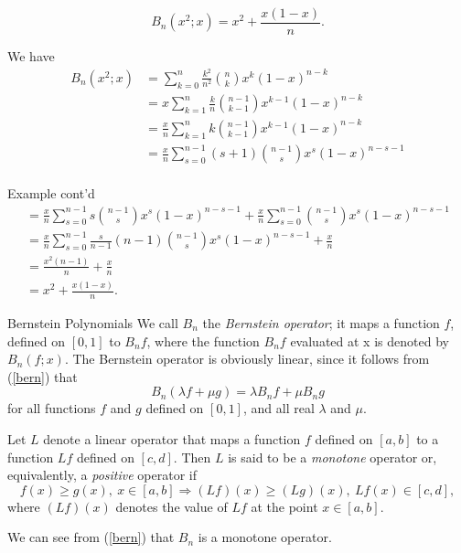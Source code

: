 \documentclass{beamer}
\begin{document}
\begin{frame}
    \begin{example}
   \begin{equation}
       \label{bernx2}
       B_n(x^2;x) = x^2 + \frac{x(1-x)}{n}.
   \end{equation}
   
       We have
       \begin{align*}
           B_n(x^2;x)
           &=\sum_{k=0}^n\frac{k^2}{n^2}\binom{n}{k}x^k(1-x)^{n-k}\\
           &=x\sum_{k=1}^n\frac{k}{n}\binom{n-1}{k-1}x^{k-1}(1-x)^{n-k}\\
           &=\frac{x}{n}\sum_{k=1}^nk\binom{n-1}{k-1}x^{k-1}(1-x)^{n-k}\\
           &=\frac{x}{n}\sum_{s=0}^{n-1}(s+1)\binom{n-1}{s}x^s(1-x)^{n-s-1}\\
       \end{align*}
\end{example}
\end{frame}
\begin{frame}{Example cont'd}
    \begin{align*}
         =\frac{x}{n}\sum_{s=0}^{n-1}s\binom{n-1}{s}x^s(1-x)^{n-s-1}+\frac{x}{n}\sum_{s=0}^{n-1}\binom{n-1}{s}x^s(1-x)^{n-s-1}\\
           =\frac{x}{n}\sum_{s=0}^{n-1}\frac{s}{n-1}(n-1)\binom{n-1}{s}x^s(1-x)^{n-s-1}+\frac{x}{n}\\
           =\frac{x^2(n-1)}{n}+\frac{x}{n}\\
           =x^2 + \frac{x(1-x)}{n}.
    \end{align*}
\end{frame}
\begin{frame}{Bernstein Polynomials}
    We call $B_n$ the \textit{Bernstein operator}; it maps a function $f$, defined on $[0, 1]$ to $B_nf$, where the function $B_nf$ evaluated at x is denoted by $B_n(f;x).$ The Bernstein operator is obviously linear, since it follows from (\ref{bern}) that \begin{equation}
B_n(\lambda f + \mu g) = \lambda B_{n}f + \mu B_{n}g
\label{bern_linear}
\end{equation}
for all functions $f$ and $g$ defined on $[0, 1]$, and all real $\lambda$ and $\mu$.
\begin{definition}
Let $L$ denote a linear operator that maps a function $f$ defined on $[a, b]$ to a function $Lf$ defined on $[c, d]$. Then $L$ is said to be a \textit{monotone} operator or, equivalently, a \textit{positive} operator if
\begin{equation}
    f(x) \geq g(x), \ x \in [a, b] \Rightarrow (Lf)(x) \geq (Lg)(x), \ Lf(x) \in [c, d],
\end{equation} 
where $(Lf)(x)$ denotes the value of $Lf$ at the point $x \in [a, b]$.
\end{definition}
We can see from (\ref{bern}) that $B_n$ is a monotone operator.
\end{frame}
\end{document}
